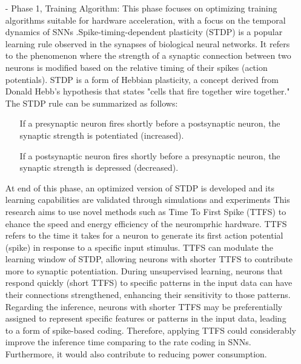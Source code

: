 \begin {itemize}
\begin{itemize}
  \item[-] Phase 1, Training Algorithm: This phase focuses on optimizing training algorithms suitable for hardware acceleration, with a focus on the temporal dynamics of SNNs .Spike-timing-dependent plasticity (STDP) is a popular learning rule observed in the synapses of biological neural networks. It refers to the phenomenon where the strength of a synaptic connection between two neurons is modified based on the relative timing of their spikes (action potentials). STDP is a form of Hebbian plasticity, a concept derived from Donald Hebb's hypothesis that states "cells that fire together wire together."
  The STDP rule can be summarized as follows:
        \begin{itemize}
       \item [] If a presynaptic neuron fires shortly before a postsynaptic neuron, the synaptic strength is potentiated (increased).
       \item[]  If a postsynaptic neuron fires shortly before a presynaptic neuron, the synaptic strength is depressed (decreased).
        \end{itemize}
       At end of this phase, an optimized version of STDP is developed and its learning capabilities are validated through simulations and experiments  
       This research aims to use novel methods such as Time To First Spike (TTFS) to ehance the speed and energy efficiency of the neuromprhic hardware. TTFS refers to the time it takes for a neuron to generate its first action potential (spike) in response to a specific input stimulus. TTFS can modulate the learning window of STDP, allowing neurons with shorter TTFS to contribute more to synaptic potentiation. During unsupervised learning, neurons that respond quickly (short TTFS) to specific patterns in the input data can have their connections strengthened, enhancing their sensitivity to those patterns. Regarding the inference, neurons with shorter TTFS may be preferentially assigned to represent specific features or patterns in the input data, leading to a form of spike-based coding. Therefore, applying TTFS could considerably improve the inference time comparing to the rate coding in SNNs. Furthermore, it would also contribute to reducing power consumption.
       

\end{itemize}
\end{itemize}
